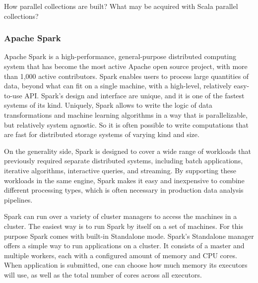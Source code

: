  How parallel collections are built?
 What may be acquired with Scala parallel collections?


\subsubsection{Apache Spark}

Apache Spark is a high-performance, general-purpose distributed computing system that has become the most active Apache open source project, with more than 1,000 active contributors. Spark enables users to process large quantities of data, beyond what can fit on a single machine, with a high-level, relatively easy-to-use API. Spark’s design and interface are unique, and it is one of the fastest systems of its kind. Uniquely, Spark allows to write the logic of data transformations and machine learning algorithms in a way that is parallelizable, but relatively system agnostic. So it is often possible to write computations that are fast for distributed storage systems of varying kind and size.

On the generality side, Spark is designed to cover a wide range of workloads that previously required separate distributed systems, including batch applications, iterative algorithms, interactive queries, and streaming. By supporting these workloads in the same engine, Spark makes it easy and inexpensive to combine different processing types, which is often necessary in production data analysis pipelines.\cite{learning_spark}

Spark can run over a variety of cluster managers to access the machines in a cluster. The easiest way is to run Spark by itself on a set of machines. For this purpose Spark comes with built-in Standalone mode. Spark’s Standalone manager offers a simple way to run applications on a cluster. It consists of a master and multiple workers, each with a configured amount of memory and CPU cores. When application is submitted, one can choose how much memory its executors will use, as well as the total number of cores across all executors.


